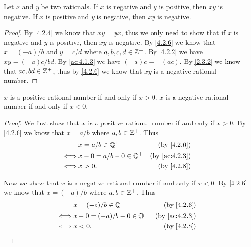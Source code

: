 \begin{ac}\label{ac:4.2.6}
  Let \(x\) and \(y\) be two rationals.
  If \(x\) is negative and \(y\) is positive, then \(xy\) is negative.
  If \(x\) is positive and \(y\) is negative, then \(xy\) is negative.
\end{ac}

\begin{proof}
  By \cref{4.2.4} we know that \(xy = yx\), thus we only need to show that if \(x\) is negative and \(y\) is positive, then \(xy\) is negative.
  By \cref{4.2.6} we know that \(x = (-a) / b\) and \(y = c / d\) where \(a, b, c, d \in \mathbb{Z}^+\).
  By \cref{4.2.2} we have \(xy = (-a)c / bd\).
  By \cref{ac:4.1.3} we have \((-a)c = -(ac)\).
  By \cref{2.3.2} we know that \(ac, bd \in \mathbb{Z}^+\), thus by \cref{4.2.6} we know that \(xy\) is a negative rational number.
\end{proof}

\begin{ac}\label{ac:4.2.7}
  \(x\) is a positive rational number if and only if \(x > 0\).
  \(x\) is a negative rational number if and only if \(x < 0\).
\end{ac}

\begin{proof}
  We first show that \(x\) is a positive rational number if and only if \(x > 0\).
  By \cref{4.2.6} we know that \(x = a / b\) where \(a, b \in \mathbb{Z}^+\).
  Thus
  \begin{align*}
         & x = a / b \in \Q^+         & \text{(by \cref{4.2.6})}    \\
    \iff & x - 0 = a / b - 0 \in \Q^+ & \text{(by \cref{ac:4.2.3})} \\
    \iff & x > 0.                     & \text{(by \cref{4.2.8})}
  \end{align*}

  Now we show that \(x\) is a negative rational number if and only if \(x < 0\).
  By \cref{4.2.6} we know that \(x = (-a) / b\) where \(a, b \in \mathbb{Z}^+\).
  Thus
  \begin{align*}
         & x = (-a) / b \in \Q^-         & \text{(by \cref{4.2.6})}    \\
    \iff & x - 0 = (-a) / b - 0 \in \Q^- & \text{(by \cref{ac:4.2.3})} \\
    \iff & x < 0.                        & \text{(by \cref{4.2.8})}
  \end{align*}
\end{proof}


